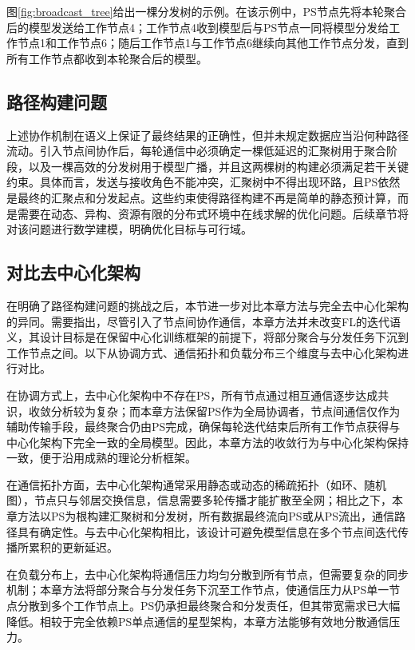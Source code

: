 \documentclass[master, vlined]{DissertUESTC}
\begin{document}
	图\ref{fig:broadcast_tree}给出一棵分发树的示例。在该示例中，PS节点先将本轮聚合后的模型发送给工作节点4；工作节点4收到模型后与PS节点一同将模型分发给工作节点1和工作节点6；随后工作节点1与工作节点6继续向其他工作节点分发，直到所有工作节点都收到本轮聚合后的模型。

	\subsection{路径构建问题}

	上述协作机制在语义上保证了最终结果的正确性，但并未规定数据应当沿何种路径流动。引入节点间协作后，每轮通信中必须确定一棵低延迟的汇聚树用于聚合阶段，以及一棵高效的分发树用于模型广播，并且这两棵树的构建必须满足若干关键约束。具体而言，发送与接收角色不能冲突，汇聚树中不得出现环路，且PS依然是最终的汇聚点和分发起点。这些约束使得路径构建不再是简单的静态预计算，而是需要在动态、异构、资源有限的分布式环境中在线求解的优化问题。后续章节将对该问题进行数学建模，明确优化目标与可行域。

	\subsection{对比去中心化架构}

	在明确了路径构建问题的挑战之后，本节进一步对比本章方法与完全去中心化架构的异同。需要指出，尽管引入了节点间协作通信，本章方法并未改变FL的迭代语义，其设计目标是在保留中心化训练框架的前提下，将部分聚合与分发任务下沉到工作节点之间。以下从协调方式、通信拓扑和负载分布三个维度与去中心化架构进行对比。

	在协调方式上，去中心化架构中不存在PS，所有节点通过相互通信逐步达成共识，收敛分析较为复杂；而本章方法保留PS作为全局协调者，节点间通信仅作为辅助传输手段，最终聚合仍由PS完成，确保每轮迭代结束后所有工作节点获得与中心化架构下完全一致的全局模型。因此，本章方法的收敛行为与中心化架构保持一致，便于沿用成熟的理论分析框架。

	在通信拓扑方面，去中心化架构通常采用静态或动态的稀疏拓扑（如环、随机图），节点只与邻居交换信息，信息需要多轮传播才能扩散至全网；相比之下，本章方法以PS为根构建汇聚树和分发树，所有数据最终流向PS或从PS流出，通信路径具有确定性。与去中心化架构相比，该设计可避免模型信息在多个节点间迭代传播所累积的更新延迟。

	在负载分布上，去中心化架构将通信压力均匀分散到所有节点，但需要复杂的同步机制；本章方法将部分聚合与分发任务下沉至工作节点，使通信压力从PS单一节点分散到多个工作节点上。PS仍承担最终聚合和分发责任，但其带宽需求已大幅降低。相较于完全依赖PS单点通信的星型架构，本章方法能够有效地分散通信压力。
\end{document}
